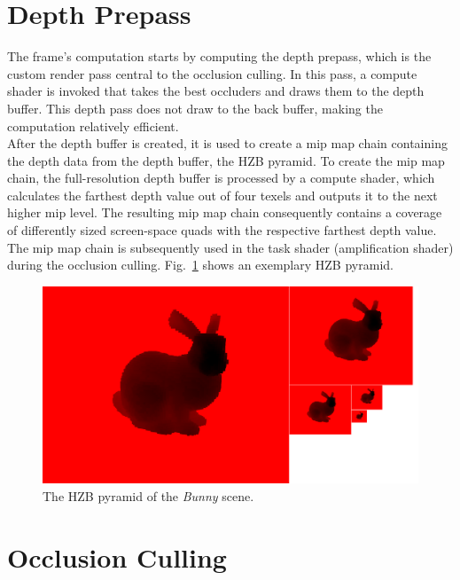 \documentclass[conference]{IEEEtran}
\begin{document}
\section{Depth Prepass} \label{sec-depth-prepass}

\noindent
The frame's computation starts by computing the depth prepass, which is the custom
render pass central to the occlusion culling. In this pass, a compute shader is invoked
that takes the best occluders and draws them to the depth buffer. This depth pass does
not draw to the back buffer, making the computation relatively efficient. \\

\noindent
After the depth buffer is created, it is used to create a mip map chain containing the depth 
data from the depth buffer, the \ac{HZB} pyramid. To create the mip map chain, the full-resolution 
depth buffer is processed by a compute shader, which calculates the farthest depth value out 
of four texels and outputs it to the next higher mip level. The resulting mip map chain consequently 
contains a coverage of differently sized screen-space quads with the respective farthest depth 
value. The mip map chain is subsequently used in the task shader (amplification shader) during the 
occlusion culling. Fig.~\ref{fig:hzb-pyramid-viz} shows an exemplary \ac{HZB} pyramid.

\begin{figure}
    \includegraphics[width=\linewidth]{images/hiz-pyramid.png}
    \caption{The \ac{HZB} pyramid of the \emph{Bunny} scene.}
    \label{fig:hzb-pyramid-viz}
\end{figure}

\section{Occlusion Culling} \label{sec-occlusion-culling}
\end{document}
